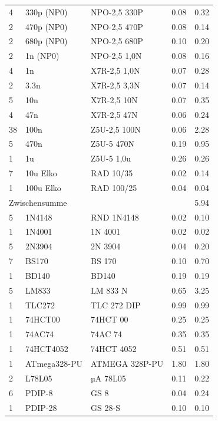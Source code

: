 \documentclass[10pt, a4paper]{paper}
\begin{document}
\begin{longtable}{|p{}|p{}|p{}|p{}|p{}|}
 4 & 330p (NP0)   & NPO-2,5 330P    & 0.08  & 0.32 \\
 2 & 470p (NP0)   & NPO-2,5 470P    & 0.08  & 0.14 \\
 2 & 680p (NP0)   & NPO-2,5 680P    & 0.10  & 0.20 \\
 2 & 1n   (NP0)   & NPO-2,5 1,0N    & 0.08  & 0.16 \\
 4 & 1n           & X7R-2,5 1,0N    & 0.07  & 0.28 \\
 2 & 3.3n         & X7R-2,5 3,3N    & 0.07  & 0.14 \\
 5 & 10n          & X7R-2,5 10N     & 0.07  & 0.35 \\
 4 & 47n          & X7R-2,5 47N     & 0.06  & 0.24 \\
38 & 100n         & Z5U-2,5 100N    & 0.06  & 2.28 \\
 5 & 470n         & Z5U-5 470N      & 0.19  & 0.95 \\
 1 & 1u           & Z5U-5 1,0u      & 0.26  & 0.26 \\
 7 & 10u Elko     & RAD 10/35       & 0.02  & 0.14 \\
 1 & 100u Elko    & RAD 100/25      & 0.04  & 0.04 \\ \hline
 \multicolumn{4}{|l|}{Zwischensumme}        & 5.94 \\ \hline 
 5 & 1N4148       & RND 1N4148      & 0.02  & 0.10 \\
 1 & 1N4001       & 1N 4001         & 0.02  & 0.02 \\ 
 5 & 2N3904       & 2N 3904         & 0.04  & 0.20 \\ 
 7 & BS170        & BS 170          & 0.10  & 0.70 \\
 1 & BD140        & BD140           & 0.19  & 0.19 \\
 5 & LM833        & LM 833 N        & 0.65  & 3.25 \\
 1 & TLC272       & TLC 272 DIP     & 0.99  & 0.99 \\
 1 & 74HCT00      & 74HCT 00        & 0.25  & 0.25 \\
 1 & 74AC74       & 74AC 74         & 0.35  & 0.35 \\
 1 & 74HCT4052    & 74HCT 4052      & 0.51  & 0.51 \\
 1 & ATmega328-PU & ATMEGA 328P-PU  & 1.80  & 1.80 \\
 2 & L78L05       & µA 78L05        & 0.11  & 0.22 \\
 6 & PDIP-8       & GS 8            & 0.04  & 0.24 \\
 1 & PDIP-28      & GS 28-S         & 0.10  & 0.10 \\

\end{longtable}
\end{document}

